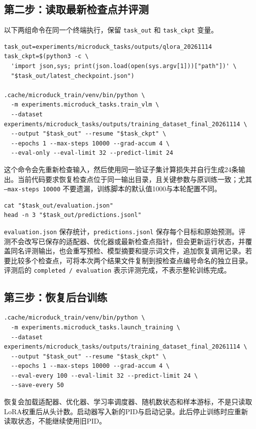 \subsection{第二步：读取最新检查点并评测}
以下两组命令在同一个终端执行，保留 \texttt{task\_out} 和 \texttt{task\_ckpt} 变量。
\begin{Verbatim}
task_out=experiments/microduck_tasks/outputs/qlora_20261114
task_ckpt=$(python3 -c \
  'import json,sys; print(json.load(open(sys.argv[1]))["path"])' \
  "$task_out/latest_checkpoint.json")

.cache/microduck_train/venv/bin/python \
  -m experiments.microduck_tasks.train_vlm \
  --dataset experiments/microduck_tasks/outputs/training_dataset_final_20261114 \
  --output "$task_out" --resume "$task_ckpt" \
  --epochs 1 --max-steps 10000 --grad-accum 4 \
  --eval-only --eval-limit 32 --predict-limit 24
\end{Verbatim}

这个命令会先重新检查输入，然后使用同一验证子集计算损失并自行生成24条输出。当前代码要求恢复检查点位于同一输出目录，且关键参数与原训练一致；尤其 \texttt{--max-steps 10000} 不要遗漏，训练脚本的默认值1000与本轮配置不同。

\begin{Verbatim}
cat "$task_out/evaluation.json"
head -n 3 "$task_out/predictions.jsonl"
\end{Verbatim}

\texttt{evaluation.json} 保存统计，\texttt{predictions.jsonl} 保存每个目标和原始预测。评测不会改写已保存的适配器、优化器或最新检查点指针，但会更新运行状态，并覆盖同名评测输出，也会重写预检、模型摘要和提示词文件，追加恢复调用记录。若要比较多个检查点，可将本次两个结果文件复制到按检查点编号命名的独立目录。评测后的 \texttt{completed / evaluation} 表示评测完成，不表示整轮训练完成。

\subsection{第三步：恢复后台训练}
\begin{Verbatim}
.cache/microduck_train/venv/bin/python \
  -m experiments.microduck_tasks.launch_training \
  --dataset experiments/microduck_tasks/outputs/training_dataset_final_20261114 \
  --output "$task_out" --resume "$task_ckpt" \
  --epochs 1 --max-steps 10000 --grad-accum 4 \
  --eval-every 100 --eval-limit 32 --predict-limit 24 \
  --save-every 50
\end{Verbatim}
恢复会加载适配器、优化器、学习率调度器、随机数状态和样本游标，不是只读取LoRA权重后从头计数。启动器写入新的PID与启动记录。此后停止训练时应重新读取状态，不能继续使用旧PID。

